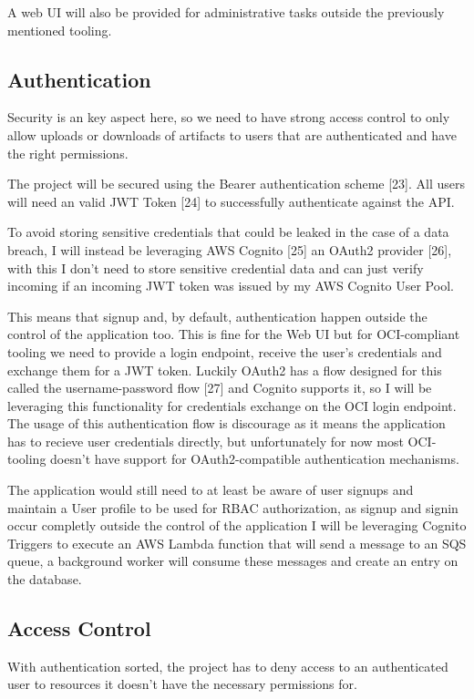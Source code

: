 \documentclass{article}
\begin{document}
  A web UI will also be provided for administrative tasks outside the previously mentioned tooling.

  \subsection{Authentication}

  Security is an key aspect here, so we need to have strong access control to only allow uploads or downloads of artifacts to users that are authenticated and have the right permissions.

  The project will be secured using the Bearer authentication scheme [23]. All users will need an valid JWT Token [24] to successfully authenticate against the API.

  To avoid storing sensitive credentials that could be leaked in the case of a data breach, I will instead be leveraging AWS Cognito [25] an OAuth2 provider [26], with this I don't need to store sensitive credential data and can just verify incoming if an incoming JWT token was issued by my AWS Cognito User Pool.

  This means that signup and, by default, authentication happen outside the control of the application too. This is fine for the Web UI but for OCI-compliant tooling we need to provide a login endpoint, receive the user's credentials and exchange them for a JWT token. Luckily OAuth2 has a flow designed for this called the username-password flow [27] and Cognito supports it, so I will be leveraging this functionality for credentials exchange on the OCI login endpoint. The usage of this authentication flow is discourage as it means the application has to recieve user credentials directly, but unfortunately for now most OCI-tooling doesn't have support for OAuth2-compatible authentication mechanisms.

  The application would still need to at least be aware of user signups and maintain a User profile to be used for RBAC authorization, as signup and signin occur completly outside the control of the application I will be leveraging Cognito Triggers to execute an AWS Lambda function that will send a message to an SQS queue, a background worker will consume these messages and create an entry on the database.

  \subsection{Access Control}

  With authentication sorted, the project has to deny access to an authenticated user to resources it doesn't have the necessary permissions for.
\end{document}
